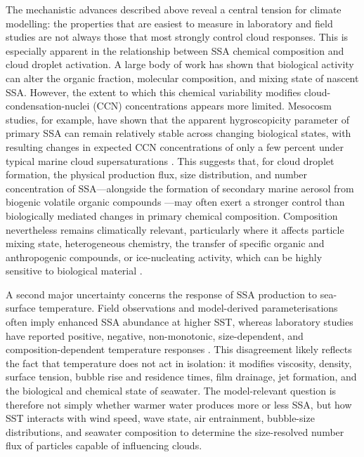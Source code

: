 \documentclass[ProofPDF]{./Styles/Jnls-Template-V3}
\begin{document}
The mechanistic advances described above reveal a central tension for climate modelling: the properties that are easiest to measure in laboratory and field studies are not always those that most strongly control cloud responses. This is especially apparent in the relationship between SSA chemical composition and cloud droplet activation. A large body of work has shown that biological activity can alter the organic fraction, molecular composition, and mixing state of nascent SSA. However, the extent to which this chemical variability modifies cloud-condensation-nuclei (CCN) concentrations appears more limited. Mesocosm studies, for example, have shown that the apparent hygroscopicity parameter of primary SSA can remain relatively stable across changing biological states, with resulting changes in expected CCN concentrations of only a few percent under typical marine cloud supersaturations \citep{Collins2016}. This suggests that, for cloud droplet formation, the physical production flux, size distribution, and number concentration of SSA---alongside the formation of secondary marine aerosol from biogenic volatile organic compounds \citep{Mayer2020}---may often exert a stronger control than biologically mediated changes in primary chemical composition. Composition nevertheless remains climatically relevant, particularly where it affects particle mixing state, heterogeneous chemistry, the transfer of specific organic and anthropogenic compounds, or ice-nucleating activity, which can be highly sensitive to biological material \citep[e.g.,][]{DeMott2016}.

A second major uncertainty concerns the response of SSA production to sea-surface temperature. Field observations and model-derived parameterisations often imply enhanced SSA abundance at higher SST, whereas laboratory studies have reported positive, negative, non-monotonic, size-dependent, and composition-dependent temperature responses \citep[e.g.,][]{Salter2014,Salter2015,Forestieri2018,Liu2021}. This disagreement likely reflects the fact that temperature does not act in isolation: it modifies viscosity, density, surface tension, bubble rise and residence times, film drainage, jet formation, and the biological and chemical state of seawater. The model-relevant question is therefore not simply whether warmer water produces more or less SSA, but how SST interacts with wind speed, wave state, air entrainment, bubble-size distributions, and seawater composition to determine the size-resolved number flux of particles capable of influencing clouds.
\end{document}
